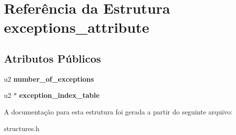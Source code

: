 \hypertarget{structexceptions__attribute}{}\section{Referência da Estrutura exceptions\+\_\+attribute}
\label{structexceptions__attribute}
\subsection*{Atributos Públicos}
\begin{DoxyCompactItemize}
\item 
\mbox{\label{structexceptions__attribute_acc85fb50930b682cc98d89e2128a065a}} 
u2 {\bfseries number\+\_\+of\+\_\+exceptions}
\item 
\mbox{\label{structexceptions__attribute_ae7a712d07214e739d25465f9806c514f}} 
u2 $\ast$ {\bfseries exception\+\_\+index\+\_\+table}
\end{DoxyCompactItemize}


A documentação para esta estrutura foi gerada a partir do seguinte arquivo\+:\begin{DoxyCompactItemize}
\item 
structures.\+h\end{DoxyCompactItemize}
